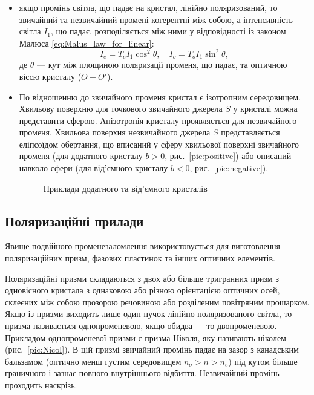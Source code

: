 \begin{itemize}
\item якщо промінь світла, що падає на кристал, лінійно поляризований, то
звичайний та незвичайний промені когерентні між собою, а
інтенсивність світла
$ I_1 $, що падає, розподіляється між ними у
відповідності із законом Малюса \eqref{eq:Malus_law_for_linear}:
\begin{equation*}
    I_e = T_eI_1\cos^2\theta, \quad I_o = T_oI_1\sin^2\theta,
\end{equation*}
де $\theta$ --- кут між площиною поляризації променя, що падає, та оптичною
віссю кристалу ($ O-O' $).

\item По відношенню до звичайного променя кристал є ізотропним середовищем. Хвильову поверхню для точкового звичайного джерела $ S $ у кристалі можна представити сферою. Анізотропія кристалу проявляється для незвичайного променя. Хвильова поверхня незвичайного джерела $ S $ представляється еліпсоїдом обертання, що вписаний у сферу хвильової поверхні звичайного променя (для додатного кристалу $ b > 0 $, рис.~\ref{pic:positive}) або описаний навколо сфери (для від’ємного кристалу $ b < 0 $, рис.~\ref{pic:negative}).

\begin{figure}[h!]\centering

\caption{Приклади додатного та від'ємного кристалів}
\end{figure}


\end{itemize}

\subsection*{Поляризаційні прилади}


Явище подвійного променезаломлення використовується для виготовлення
поляризаційних призм, фазових пластинок та інших оптичних
елементів.

Поляризаційні призми складаються з двох або більше тригранних призм з одновісного кристала з однаковою або різною орієнтацією оптичних осей, склеєних між собою прозорою речовиною або розділеним повітряним прошарком. Якщо із призми виходить лише один пучок лінійно поляризованого світла, то призма називається однопроменевою, якщо обидва --- то двопроменевою. Прикладом однопроменевої призми є призма Ніколя, яку називають ніколем (рис.~\ref{pic:Nicol}). В цій призмі звичайний промінь падає на зазор з канадським бальзамом (оптично менш густим середовищем $n_o > n > n_e$) під кутом більше граничного і зазнає повного
внутрішнього відбиття. Незвичайний промінь проходить наскрізь.

